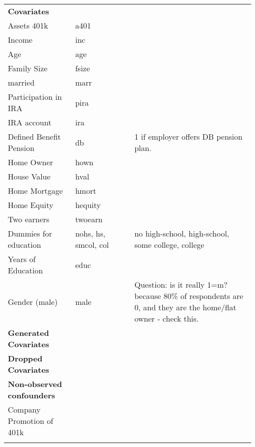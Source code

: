 \documentclass[12pt,a4paper]{article}
\begin{document}
\begin{landscape}
\begin{singlespace}
\begin{ThreePartTable}
\begin{longtable}{l C{2cm} C{4cm} C{6cm} C{6cm} }
					\midrule
					\textbf{Covariates} & & & & \\
					Assets 401k & a401 & & & \\
					Income & inc & & &  \\
					Age & age & & & \\
					Family Size & fsize & & & \\
					married & marr & & & \\
					Participation in IRA & pira & & & \\
					IRA account & ira & & & \\
					Defined Benefit Pension & db & & & 1 if employer offers DB pension plan.\\
					Home Owner & hown & & & \\
					House Value & hval & & & \\
					Home Mortgage & hmort & & & \\
					Home Equity & hequity & & & \\
					Two earners & twoearn & & & \\
					Dummies for education & nohs, hs, smcol, col & & & no high-school, high-school, some college, college\\
					Years of Education & educ & & & \\
					Gender (male) & male & & & Question: is it really 1=m? because 80\% of respondents are 0, and they are the home/flat owner - check this. \\
					\midrule
					\textbf{Generated Covariates} & & & & \\
					\midrule
					\textbf{Dropped Covariates} & & & & \\
					\midrule
					\textbf{Non-observed confounders} & & & & \\
					Company Promotion of 401k & & & & \\
					\bottomrule
				\insertTableNotes \\
				\end{longtable} 

				
			\end{ThreePartTable}
\end{singlespace} 
\end{landscape}
\end{document}
